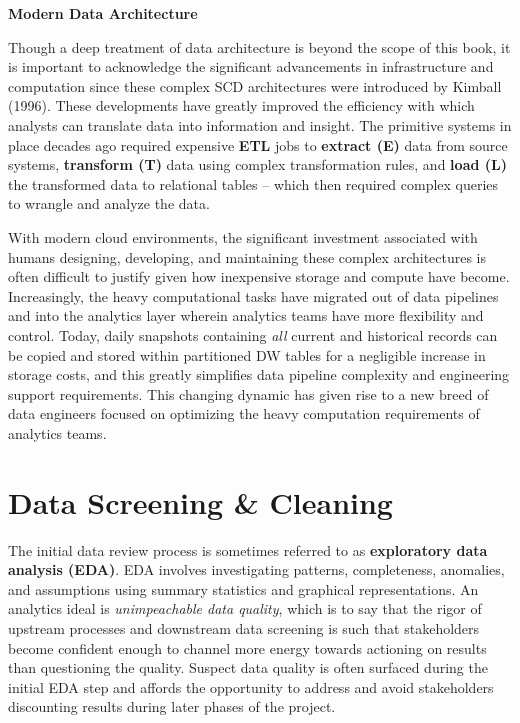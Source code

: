\documentclass[
]{book}
\begin{document}
\textbf{Modern Data Architecture}

Though a deep treatment of data architecture is beyond the scope of this book, it is important to acknowledge the significant advancements in infrastructure and computation since these complex SCD architectures were introduced by Kimball (1996). These developments have greatly improved the efficiency with which analysts can translate data into information and insight. The primitive systems in place decades ago required expensive \textbf{ETL} jobs to \textbf{extract (E)} data from source systems, \textbf{transform (T)} data using complex transformation rules, and \textbf{load (L)} the transformed data to relational tables -- which then required complex queries to wrangle and analyze the data.

With modern cloud environments, the significant investment associated with humans designing, developing, and maintaining these complex architectures is often difficult to justify given how inexpensive storage and compute have become. Increasingly, the heavy computational tasks have migrated out of data pipelines and into the analytics layer wherein analytics teams have more flexibility and control. Today, daily snapshots containing \emph{all} current and historical records can be copied and stored within partitioned DW tables for a negligible increase in storage costs, and this greatly simplifies data pipeline complexity and engineering support requirements. This changing dynamic has given rise to a new breed of data engineers focused on optimizing the heavy computation requirements of analytics teams.

\hypertarget{data-screening-cleaning}{%
\section{Data Screening \& Cleaning}\label{data-screening-cleaning}}

The initial data review process is sometimes referred to as \textbf{exploratory data analysis (EDA)}. EDA involves investigating patterns, completeness, anomalies, and assumptions using summary statistics and graphical representations. An analytics ideal is \emph{unimpeachable data quality}, which is to say that the rigor of upstream processes and downstream data screening is such that stakeholders become confident enough to channel more energy towards actioning on results than questioning the quality. Suspect data quality is often surfaced during the initial EDA step and affords the opportunity to address and avoid stakeholders discounting results during later phases of the project.
\end{document}
